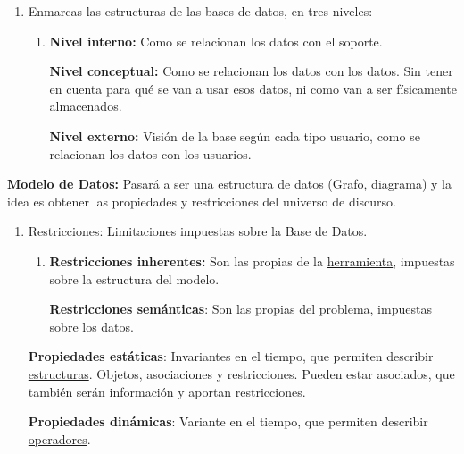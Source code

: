 \documentclass[12pt, twoside, openright]{report} %
\begin{document}
  \begin{enumerate}
  \item Enmarcas las estructuras de las bases de datos, en tres niveles:
    

    \begin{enumerate}
    \item \textbf{Nivel interno:} Como se relacionan los datos con el
      soporte.
      

      
      \textbf{Nivel conceptual:} Como se relacionan los datos con los
      datos. Sin tener en cuenta para qué se van a usar esos datos, ni
      como van a ser físicamente almacenados.
      

      
      \textbf{Nivel externo:} Visión de la base según cada tipo usuario,
      como se relacionan los datos con los usuarios.
      
    \end{enumerate}
  \end{enumerate}
\pagebreak
  \textbf{Modelo de Datos:} Pasará a ser una estructura de datos (Grafo,
  diagrama) y la idea es obtener las propiedades y restricciones del
  universo de discurso.

  \begin{enumerate}
  \item Restricciones: Limitaciones impuestas sobre la Base de Datos.
    

    \begin{enumerate}
    \item \textbf{Restricciones inherentes:} Son las propias de la
      \underline{herramienta}, impuestas sobre la estructura del modelo.
      

      
      \textbf{Restricciones semánticas}: Son las propias del
      \underline{problema}, impuestas sobre los datos.
      
    \end{enumerate}

    
    \textbf{Propiedades estáticas}: Invariantes en el tiempo, que
    permiten describir \underline{estructuras}. Objetos, asociaciones y
    restricciones. Pueden estar asociados, que también serán información
    y aportan restricciones.
    

    
    \textbf{Propiedades dinámicas}: Variante en el tiempo, que permiten
    describir \underline{operadores}.
    
  \end{enumerate}
\end{document}
